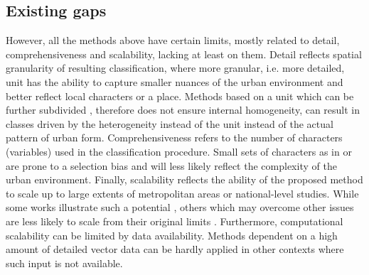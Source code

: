 \subsection{Existing gaps}
\label{sec:lit_gaps}
However, all the methods above have certain limits, mostly related to detail, comprehensiveness and scalability, lacking at least on them. Detail reflects spatial granularity of resulting classification, where more granular, i.e. more detailed, unit has the ability to capture smaller nuances of the urban environment and better reflect local characters or a place. Methods based on a unit which can be further subdivided \citep{dibble2019origin,jochem2020,araldi2019,gil2012}, therefore does not ensure internal homogeneity, can result in classes driven by the heterogeneity instead of the unit instead of the actual pattern of urban form. Comprehensiveness refers to the number of characters (variables) used in the classification procedure. Small sets of characters as in \cite{bobkova2019} or \cite{serra2018a} are prone to a selection bias and will less likely reflect the complexity of the urban environment. Finally, scalability reflects the ability of the proposed method to scale up to large extents of metropolitan areas or national-level studies. While some works illustrate such a potential \citep{jochem2020, schirmer2015,bobkova2019,araldi2019}, others which may overcome other issues are less likely to scale from their original limits \citep{dibble2019origin}. Furthermore, computational scalability can be limited by data availability. Methods dependent on a high amount of detailed vector data \citep{bobkova2019} can be hardly applied in other contexts where such input is not available.



